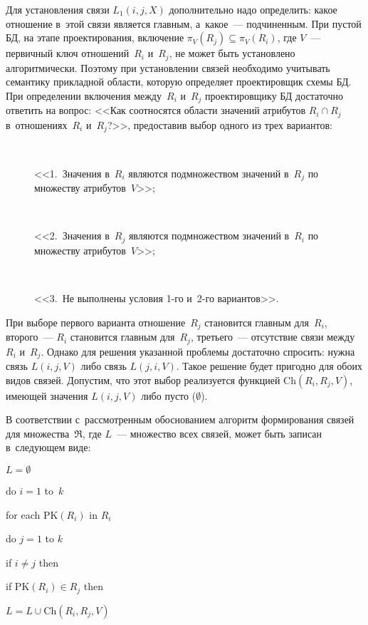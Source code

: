 \begin{multicols}{2}
  Для установления связи $L_1(i,j,X)$ дополнительно надо определить: какое
отношение в~этой связи является главным, а~какое~--- подчиненным. При
пустой БД, на этапе проектирования, включение $\pi_V(R_j)\subseteq
\pi_V(R_i)$, где $V$~--- первичный ключ отношений~$R_i$ и~$R_j$, не может
быть установлено алгоритмически. Поэтому при установлении связей
необходимо учитывать семантику прикладной области, которую определяет
проектировщик схемы БД. При определении включения между~$R_i$ и~$R_j$
проектировщику БД достаточно ответить на вопрос: <<Как соотносятся
области значений атрибутов $R_i\cap R_j$ в~отношениях~$R_i$ и~$R_{j}$?>>,
предоставив выбор одного из трех вариантов: 
\begin{description}
\item[\,] <<1.~Значения в~$R_i$ являются
подмножеством значений в~$R_j$ по множеству атрибутов~$V$>>;
\item[\,] <<2.~Значения в~$R_j$ являются подмножеством значений в~$R_i$ по
множеству атрибутов~$V$>>; 
\item[\,] <<3.~Не выполнены условия 1-го и~2-го
вариантов>>.
\end{description}

 При выборе первого варианта отношение~$R_j$ становится
главным для~$R_i$, второго~--- $R_i$ становится главным для~$R_j$,
третьего~--- отсутствие связи между~$R_i$ и~$R_j$. Однако для решения
указанной проб\-ле\-мы достаточно спросить: нужна связь $L(i,j,V)$ либо связь
$L(j,i,V)$. Такое решение будет пригодно для обоих видов связей. Допустим,
что этот выбор реализуется функцией $\mathrm{Ch}(R_i, R_j, V)$, имеющей значения
$L(i,j,V)$ либо пусто ($\emptyset$).

  В соответствии с~рассмотренным обоснованием алгоритм формирования
связей для множества~$\mathfrak{R}$, где $L$~--- множество всех связей,
может быть записан в~следующем виде:

\noindent
$L=\emptyset$

\noindent
do $i=1$ to~$k$

\hspace*{2mm}for each $\mathrm{PK}(R_i)$ in $R_i$

\hspace*{4mm}do $j=1$ to $k$

\hspace*{6mm}if $i\not= j$ then

\hspace*{8mm}if $\mathrm{PK}(R_i)\in R_j$ then

\hspace*{9mm}$L=L\cup \mathrm{Ch}(R_i,R_j,V)$


\end{multicols}

